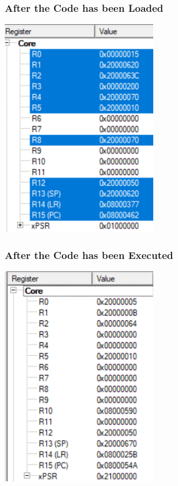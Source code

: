\documentclass{article}
\begin{document}
\subsubsection{After the Code has been Loaded}

\begin{center}
    \includegraphics[width=0.5\textwidth]{task_iv_D_before.png}
\end{center}

\subsubsection{After the Code has been Executed}

\begin{center}
    \includegraphics[width=0.5\textwidth]{task_iv_D_after.png}
\end{center}
\end{document}
